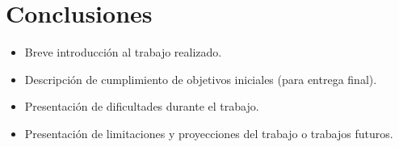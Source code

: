\section{Conclusiones}
\label{sc:Concl}

\begin{itemize}
    \item Breve introducción al trabajo realizado.
    \item Descripción de cumplimiento de objetivos iniciales (para entrega final).
    \item Presentación de dificultades durante el trabajo.
    \item Presentación de limitaciones y proyecciones del trabajo o trabajos futuros.
\end{itemize}




